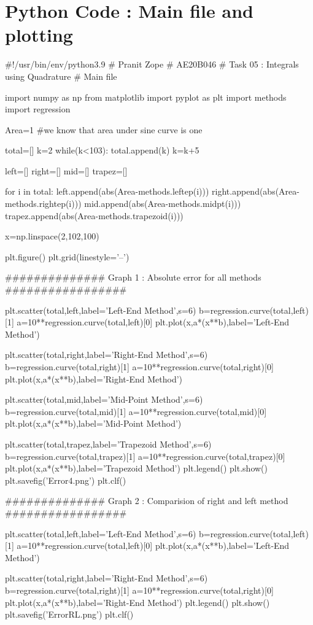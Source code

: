 \documentclass[12pt]{article}
\begin{document}
\section{Python Code : Main file and plotting}
\begin{python}
#!/usr/bin/env/python3.9
# Pranit Zope
# AE20B046
# Task 05 : Integrals using Quadrature
# Main file

import numpy as np
from matplotlib import pyplot as plt
import methods
import regression

Area=1  #we know that area under sine curve is one

total=[]
k=2
while(k<103):
    total.append(k)
    k=k+5

left=[]
right=[]
mid=[]
trapez=[]

for i in total:
    left.append(abs(Area-methods.leftep(i)))
    right.append(abs(Area-methods.rightep(i)))
    mid.append(abs(Area-methods.midpt(i)))
    trapez.append(abs(Area-methods.trapezoid(i)))

x=np.linspace(2,102,100)

plt.figure()
plt.grid(linestyle='--')


##############  Graph 1 : Absolute error for all methods #################

plt.scatter(total,left,label='Left-End Method',s=6)
b=regression.curve(total,left)[1]
a=10**regression.curve(total,left)[0]
plt.plot(x,a*(x**b),label='Left-End Method')

plt.scatter(total,right,label='Right-End Method',s=6)
b=regression.curve(total,right)[1]
a=10**regression.curve(total,right)[0]
plt.plot(x,a*(x**b),label='Right-End Method')

plt.scatter(total,mid,label='Mid-Point Method',s=6)
b=regression.curve(total,mid)[1]
a=10**regression.curve(total,mid)[0]
plt.plot(x,a*(x**b),label='Mid-Point Method')

plt.scatter(total,trapez,label='Trapezoid Method',s=6)
b=regression.curve(total,trapez)[1]
a=10**regression.curve(total,trapez)[0]
plt.plot(x,a*(x**b),label='Trapezoid Method')
plt.legend()
plt.show()
plt.savefig('Error4.png')
plt.clf()

##############  Graph 2 : Comparision of right and left method #################

plt.scatter(total,left,label='Left-End Method',s=6)
b=regression.curve(total,left)[1]
a=10**regression.curve(total,left)[0]
plt.plot(x,a*(x**b),label='Left-End Method')

plt.scatter(total,right,label='Right-End Method',s=6)
b=regression.curve(total,right)[1]
a=10**regression.curve(total,right)[0]
plt.plot(x,a*(x**b),label='Right-End Method')
plt.legend()
plt.show()
plt.savefig('ErrorRL.png')
plt.clf()


\end{python}
\end{document}
